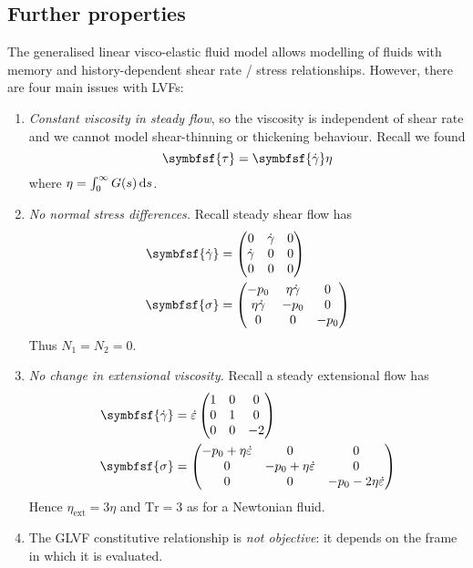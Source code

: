 \documentclass{jknotes}
\begin{document}
\subsection{Further properties}
The generalised linear visco-elastic fluid model allows modelling of fluids
with memory and history-dependent shear rate / stress relationships. However,
there are four main issues with LVFs:
\begin{enumerate}
	\item \emph{Constant viscosity in steady flow}, so the viscosity is
		independent of shear rate and we cannot model shear-thinning or
		thickening behaviour. Recall we found
		\begin{equation}
			\symbfsf{\tau} = \symbfsf{\srate}\eta
		\end{equation}
		where $\eta = \int_0^\infty G(s) \, \diffd s$.
	\item \emph{No normal stress differences.} Recall steady shear flow has
		\begin{align}
			\symbfsf{\srate} &= \begin{pmatrix} 0 & \srate & 0 \\ \srate & 0 &
			0 \\ 0 & 0 & 0 \end{pmatrix} \\
			\symbfsf{\sigma} &= \begin{pmatrix} -p_0 & \eta \srate & 0 \\ \eta
			\srate & -p_0 & 0 \\ 0 & 0 & -p_0 \end{pmatrix}
		\end{align}
		Thus $N_1 = N_2 = 0$.

	\item \emph{No change in extensional viscosity.} Recall a steady
		extensional flow has
		\begin{align}
			\symbfsf{\srate} &= \dot{\vare} \begin{pmatrix} 1 & 0 & 0 \\ 0 & 1 &
			0 \\ 0 & 0 & -2 \end{pmatrix} \\
			\symbfsf{\sigma} &= \begin{pmatrix} -p_0 + \eta \dot{\vare} & 0 &0
				\\ 0 & -p_0 + \eta \dot{\vare} & 0 \\ 0 & 0 & -p_0 - 2 \eta
			\dot{\vare} \end{pmatrix}
		\end{align}
		Hence $\eta_{\text{ext}} = 3 \eta$ and $\text{Tr} = 3$ as for a
		Newtonian fluid.

	\item The GLVF constitutive relationship is \emph{not objective}: it
		depends on the frame in which it is evaluated.
\end{enumerate}
\end{document}
